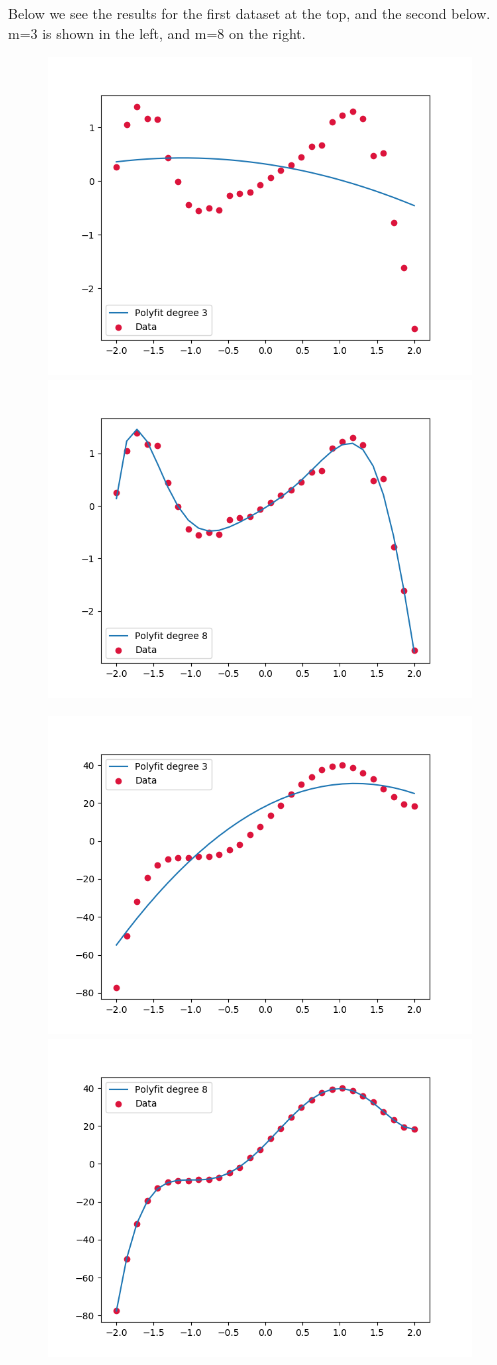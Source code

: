 \documentclass[12p,a4paper]{article}
\begin{document}
Below we see the results for the first dataset at the top, and the second below. m=3 is shown in the left, and m=8 on the right.
\begin{figure}[H]
    \includegraphics[width=0.5\linewidth]{../plots/QR_y0_m=3.png}
    \includegraphics[width=0.5\linewidth]{../plots/QR_y0_m=8.png}
\end{figure}
\begin{figure}[H]
    \includegraphics[width=0.5\linewidth]{../plots/QR_y1_m=3.png}
    \includegraphics[width=0.5\linewidth]{../plots/QR_y1_m=8.png}
\end{figure}
    
\end{document}
